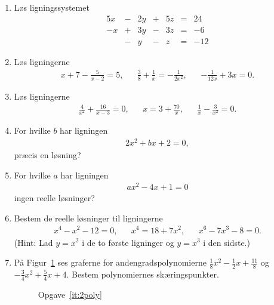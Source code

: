 \begin{enumerate}
\item Løs ligningssystemet
\begin{alignat*}{5}
x&{}-{}&2y&{}+{}&5z&{}={}&24\\
-x&{}+{}&3y&{}-{}&3z&{}={}&-6\\
&{}-{}&y&{}-{}& z&{}={}&-12
\end{alignat*}


\item Løs ligningerne 
\begin{align*}
x+7-\frac{5}{x-2}=5, && \frac{3}{8}+\frac{1}{x}=-\frac{1}{2x^2},&& -\frac{1}{12x}+3x=0.
\end{align*}

\item Løs ligningerne
\begin{align*}
 \frac{4}{x^2}+\frac{16}{x-3}=0,&& x=3+\frac{70}{x},&& \frac{1}{x}- \frac{3}{x^2}=0.
\end{align*}

\item For hvilke $b$ har ligningen
\begin{align*}
2x^2+bx+2=0,
\end{align*}
præcis en løsning?

\item For hvilke $a$ har ligningen 
\begin{align*}
ax^2-4x+1=0
\end{align*}
ingen reelle løsninger?

\item Bestem de reelle løsninger til ligningerne
\begin{align*}
x^4-x^2-12=0,&& x^4=18+7x^2,&& x^6-7x^3-8=0.
\end{align*}
(Hint: Lad $y=x^2$ i de to første ligninger og $y=x^3$ i den sidste.)


\item \label{it:2poly} På Figur~\ref{fig:2poly} ses graferne for andengradspolynomierne $\frac{1}{8}x^2-\frac{1}{2}x+\frac{11}{8}$ og $-\frac{3}{4}x^2+\frac{5}{4}x+4$. Bestem polynomiernes skæringspunkter. 
\begin{figure}
\centering
{}
\caption{Opgave~\ref{it:2poly}}
\label{fig:2poly}
\end{figure}


\end{enumerate}
